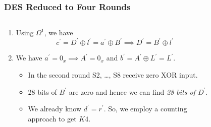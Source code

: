 \documentclass{beamer}
\begin{document}
    \begin{frame}
        \frametitle{DES Reduced to Four Rounds}
        \begin{columns}
            \begin{column}{0.65\textwidth}
                \begin{enumerate}
                    \item<2-> Using \(\Omega^1\), we have
                    \begin{equation}
                        c^\prime = D^\prime \oplus l^\prime = a^\prime \oplus B^\prime \implies D^\prime = B^\prime \oplus l^\prime
                        \label{eq:des-4rd-D}
                    \end{equation}
                    \item<3-> We have \(a^\prime = 0_x \implies A^\prime = 0_x\)
                    and \(b^\prime = A^\prime \oplus L^\prime = L^\prime\).
                    \begin{itemize}
                        \item<4-> In the second round S2, \dots, S8 receive
                        zero XOR input.
                        \item<5-> 28 bits of \(B^\prime\) are zero and hence we
                        can find \emph{28 bits of \(D^\prime\)}.
                        \item<6-> We already know \(d^\prime = r^\prime\). So,
                        we employ a counting approach to get \(K4\).
                    \end{itemize}
                \end{enumerate}
            \end{column}
            \begin{column}{0.35\textwidth}
                \begin{figure}[!ht]
                    \centering

\end{figure}
\end{column}
\end{columns}
\end{frame}
\end{document}
